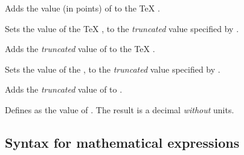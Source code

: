 \begin{command}{\pgfmathaddtolength{}}
  Adds the value (in points) of  to the \TeX{} 
  . 
\end{command}

\begin{command}{\pgfmathsetcount{}}
  Sets the value of the \TeX{} , to the 
  \emph{truncated} value specified by . 
\end{command}

\begin{command}{\pgfmathaddtocount{}}
  Adds the \emph{truncated} value  of  to the \TeX{} 
  .
\end{command}

\begin{command}{\pgfmathsetcounter{}}
  Sets the value of the , to the \emph{truncated} value 
  specified by . 
\end{command}

\begin{command}{\pgfmathaddtocounter{}}
  Adds the \emph{truncated} value  of  to 
  .
\end{command}


\begin{command}{\pgfmathsetmacro{}}
  Defines  as the  value of . The result
  is a decimal \emph{without} units.
\end{command}



\subsection{Syntax for mathematical expressions}

